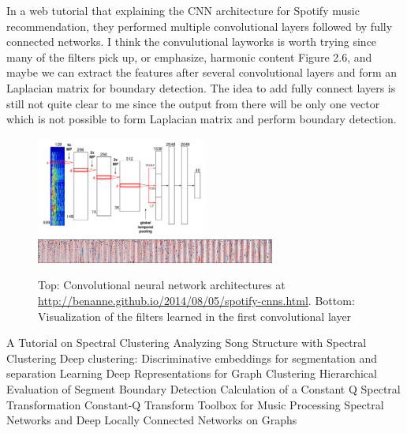 \documentclass[final]{siamltexmm}
\begin{document}
In a web tutorial that explaining the CNN architecture for Spotify music recommendation, they performed multiple convolutional layers followed by fully connected networks. I think the convulutional layworks is worth trying since many of the filters pick up, or emphasize, harmonic content Figure 2.6, and maybe we can extract the features after several convolutional layers and form an Laplacian matrix for boundary detection. The idea to add fully connect layers is still not quite clear to me since the output from there will be only one vector which is not possible to form Laplacian matrix and perform boundary detection.
\begin{figure}[H]
  \centering
    \includegraphics[width=0.5\textwidth]{./figure/spotify_convnet.png}
    \includegraphics[width=0.7\textwidth]{./figure/filters_hires.png}
  \caption{Top: Convolutional neural network architectures at \url{http://benanne.github.io/2014/08/05/spotify-cnns.html}. Bottom: Visualization of the filters learned in the first convolutional layer}
\end{figure}


\begin{thebibliography}{10}
 {\sc A Tutorial on Spectral Clustering}
 {\sc Analyzing Song Structure with Spectral Clustering}
 {\sc Deep clustering: Discriminative embeddings for
segmentation and separation}
 {\sc Learning Deep Representations for Graph Clustering}
 {\sc Hierarchical Evaluation of Segment Boundary Detection}
 {\sc Calculation of a Constant Q Spectral Transformation}
 {\sc Constant-Q Transform Toolbox for Music Processing}
 {\sc Spectral Networks and Deep Locally Connected Networks on Graphs}
\end{thebibliography}
\end{document}
